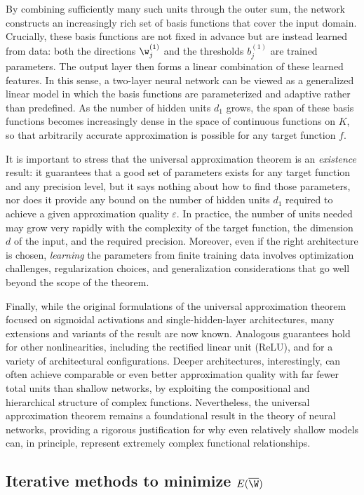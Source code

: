 By combining sufficiently many such units through the outer sum, the network constructs an increasingly rich set of basis functions that cover the input domain. Crucially, these basis functions are not fixed in advance but are instead learned from data: both the directions $\w_j^{(1)}$ and the thresholds $b_j^{(1)}$ are trained parameters. The output layer then forms a linear combination of these learned features. In this sense, a two-layer neural network can be viewed as a generalized linear model in which the basis functions are parameterized and adaptive rather than predefined. As the number of hidden units $d_1$ grows, the span of these basis functions becomes increasingly dense in the space of continuous functions on $K$, so that arbitrarily accurate approximation is possible for any target function $f$.

It is important to stress that the universal approximation theorem is an \emph{existence} result: it guarantees that a good set of parameters exists for any target function and any precision level, but it says nothing about how to find those parameters, nor does it provide any bound on the number of hidden units $d_1$ required to achieve a given approximation quality $\varepsilon$. In practice, the number of units needed may grow very rapidly with the complexity of the target function, the dimension $d$ of the input, and the required precision. Moreover, even if the right architecture is chosen, \emph{learning} the parameters from finite training data involves optimization challenges, regularization choices, and generalization considerations that go well beyond the scope of the theorem.

Finally, while the original formulations of the universal approximation theorem focused on sigmoidal activations and single-hidden-layer architectures, many extensions and variants of the result are now known. Analogous guarantees hold for other nonlinearities, including the rectified linear unit (ReLU), and for a variety of architectural configurations. Deeper architectures, interestingly, can often achieve comparable or even better approximation quality with far fewer total units than shallow networks, by exploiting the compositional and hierarchical structure of complex functions. Nevertheless, the universal approximation theorem remains a foundational result in the theory of neural networks, providing a rigorous justification for why even relatively shallow models can, in principle, represent extremely complex functional relationships.

\subsection*{Iterative methods to minimize $E(\overline{\W})$}

